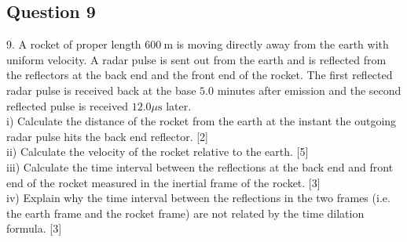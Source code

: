 \documentclass{article}
\begin{document}
\subsection{Question 9}
9. A rocket of proper length $600 \mathrm{~m}$ is moving directly away from the earth with uniform velocity. A radar pulse is sent out from the earth and is reflected from the reflectors at the back end and the front end of the rocket. The first reflected radar pulse is received back at the base $5.0$ minutes after emission and the second reflected pulse is received $12.0 \mu \mathrm{s}$ later. \\
i) Calculate the distance of the rocket from the earth at the instant the outgoing radar pulse hits the back end reflector. [2] \\
ii) Calculate the velocity of the rocket relative to the earth. [5] \\
iii) Calculate the time interval between the reflections at the back end and front end of the rocket measured in the inertial frame of the rocket. [3] \\
iv) Explain why the time interval between the reflections in the two frames (i.e. the earth frame and the rocket frame) are not related by the time dilation formula. [3]
\end{document}
